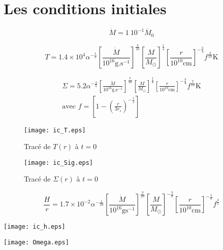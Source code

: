 \section{Les conditions initiales}
\begin{frame}
	\begin{equation*}
	\dot{M} = 1\ 10^{-1 }\dot{M_{0}}
\end{equation*} 

\begin{equation*}
	T = 1.4 \times 10^{4} \alpha^{- \frac{1}{5}} \left[ \frac{\dot{M}}{10^{16} \mathrm{g.s}^{-1}} \right]^{\frac{3}{10}} \left[ \frac{M}{M_\odot}\right]^{\frac{1}{4}} \left[ \frac{r}{10^{10}\mathrm{cm}}\right]^{- \frac{3}{4}} f^{\frac{3}{10}} \mathrm{K} 
\end{equation*}

\begin{align}
	\Sigma = 5.2 \alpha^{- \frac{4}{5}} \left[ \frac{\dot{M}}{10^{16} \mathrm{g.s}^{-1}} \right]^{\frac{7}{10}} \left[ \frac{M}{M_\odot}\right]^{\frac{1}{4}} \left[ \frac{r}{10^{10} \mathrm{cm}}\right]^{- \frac{3}{4}} f^{\frac{7}{10}} \mbox{K}  \\ 
	\text{avec } f = \left[ 1 - \left( \frac{r}{3 r_{s}}\right)^{- \frac{1}{2}}\right]
\end{align}
\end{frame}

\begin{frame}
 \begin{figure}[ht]
   \begin{minipage}[c]{.46\linewidth}
      \texttt{[image: ic\_T.eps]}
      \caption{Tracé de $T(r)$ à $t = 0$}
   \end{minipage} \hfill
   \begin{minipage}[c]{.46\linewidth}
      \texttt{[image: ic\_Sig.eps]}
      \caption{Tracé de $\Sigma(r)$ à $t = 0$}
   \end{minipage}
\end{figure} 
\end{frame}

\begin{frame}
	\begin{equation*}
	\frac{H}{r} = 1.7 \times 10^{-2}\alpha^{- \frac{1}{10}} \left[ \frac{\dot{M}}{10^{16} \mbox{g} \mbox{s}^{-1}} \right]^{\frac{3}{20}} \left[ \frac{M}{M_\odot}\right]^{- \frac{3}{8}} \left[ \frac{r}{10^{10} \mathrm{cm}}\right]^{- \frac{1}{8}} f^{\frac{3}{5}}
\end{equation*}
\end{frame}

\begin{frame}
	\begin{center}
		\texttt{[image: ic\_h.eps]}
	\end{center}
\end{frame}

\begin{frame}
	\begin{center}
		\texttt{[image: Omega.eps]}
	\end{center}
\end{frame}
